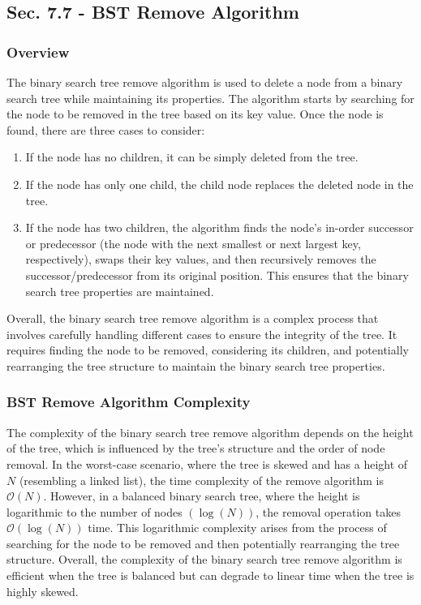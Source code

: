 \subsection*{Sec. 7.7 - BST Remove Algorithm}

\subsubsection{Overview}

The binary search tree remove algorithm is used to delete a node from a binary search tree while maintaining its properties. The algorithm starts by searching for the node to be removed in the tree based on its key value. Once the node is found, there are three cases to consider:
\begin{enumerate}
    \item If the node has no children, it can be simply deleted from the tree.
    \item If the node has only one child, the child node replaces the deleted node in the tree.
    \item If the node has two children, the algorithm finds the node's in-order successor or predecessor (the node with the next smallest or next largest key, respectively), swaps their key values, and then recursively removes the successor/predecessor from its original position. This ensures that the binary search tree properties are maintained.
\end{enumerate}
Overall, the binary search tree remove algorithm is a complex process that involves carefully handling different cases to ensure the integrity of the tree. It requires finding the node to be removed, considering its children, and potentially rearranging the tree structure to maintain the binary search tree properties.

\subsubsection{BST Remove Algorithm Complexity}

The complexity of the binary search tree remove algorithm depends on the height of the tree, which is influenced by the tree's structure and the order of node removal. In the worst-case scenario, where the tree is skewed and has a height of $N$ (resembling a linked list), the time complexity of the remove algorithm is $\mathcal{O}(N)$. However, in 
a balanced binary search tree, where the height is logarithmic to the number of nodes $(\log{(N)})$, the removal operation takes $\mathcal{O}(\log{(N)})$ time. This logarithmic complexity arises from the process of searching for the node to be removed and then potentially rearranging the tree structure. Overall, the complexity of the binary search tree 
remove algorithm is efficient when the tree is balanced but can degrade to linear time when the tree is highly skewed.

